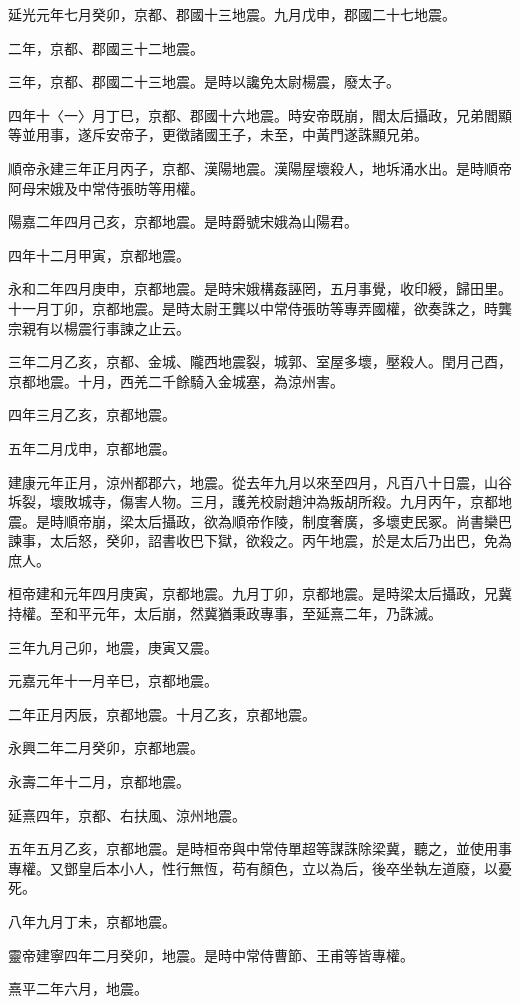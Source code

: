 \begin{pinyinscope}
延光元年七月癸卯，京都、郡國十三地震。九月戊申，郡國二十七地震。

二年，京都、郡國三十二地震。

三年，京都、郡國二十三地震。是時以讒免太尉楊震，廢太子。

四年十〈一〉月丁巳，京都、郡國十六地震。時安帝既崩，閻太后攝政，兄弟閻顯等並用事，遂斥安帝子，更徵諸國王子，未至，中黃門遂誅顯兄弟。

順帝永建三年正月丙子，京都、漢陽地震。漢陽屋壞殺人，地坼涌水出。是時順帝阿母宋娥及中常侍張昉等用權。

陽嘉二年四月己亥，京都地震。是時爵號宋娥為山陽君。

四年十二月甲寅，京都地震。

永和二年四月庚申，京都地震。是時宋娥構姦誣罔，五月事覺，收印綬，歸田里。十一月丁卯，京都地震。是時太尉王龔以中常侍張昉等專弄國權，欲奏誅之，時龔宗親有以楊震行事諫之止云。

三年二月乙亥，京都、金城、隴西地震裂，城郭、室屋多壞，壓殺人。閏月己酉，京都地震。十月，西羌二千餘騎入金城塞，為涼州害。

四年三月乙亥，京都地震。

五年二月戊申，京都地震。

建康元年正月，涼州都郡六，地震。從去年九月以來至四月，凡百八十日震，山谷坼裂，壞敗城寺，傷害人物。三月，護羌校尉趙沖為叛胡所殺。九月丙午，京都地震。是時順帝崩，梁太后攝政，欲為順帝作陵，制度奢廣，多壞吏民冢。尚書欒巴諫事，太后怒，癸卯，詔書收巴下獄，欲殺之。丙午地震，於是太后乃出巴，免為庶人。

桓帝建和元年四月庚寅，京都地震。九月丁卯，京都地震。是時梁太后攝政，兄冀持權。至和平元年，太后崩，然冀猶秉政專事，至延熹二年，乃誅滅。

三年九月己卯，地震，庚寅又震。

元嘉元年十一月辛巳，京都地震。

二年正月丙辰，京都地震。十月乙亥，京都地震。

永興二年二月癸卯，京都地震。

永壽二年十二月，京都地震。

延熹四年，京都、右扶風、涼州地震。

五年五月乙亥，京都地震。是時桓帝與中常侍單超等謀誅除梁冀，聽之，並使用事專權。又鄧皇后本小人，性行無恆，苟有顏色，立以為后，後卒坐執左道廢，以憂死。

八年九月丁未，京都地震。

靈帝建寧四年二月癸卯，地震。是時中常侍曹節、王甫等皆專權。

熹平二年六月，地震。


\end{pinyinscope}
